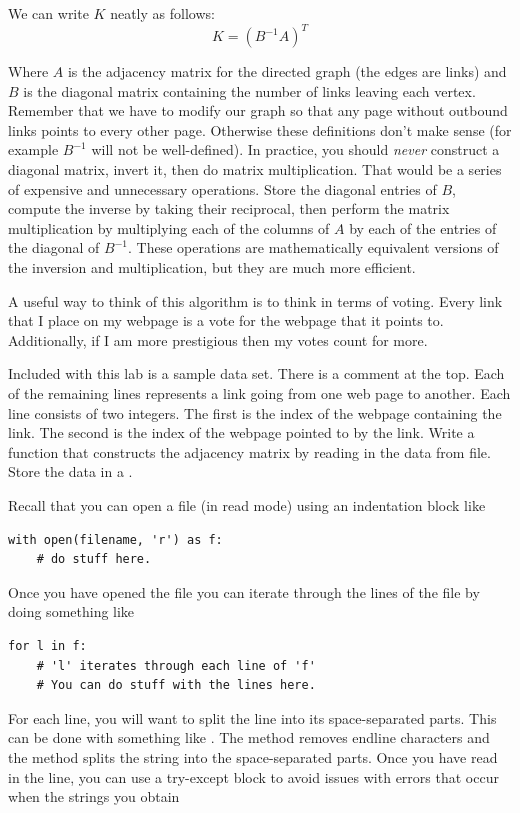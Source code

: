 We can write $K$ neatly as follows:
\[K = (B^{-1}A)^T\]

Where $A$ is the adjacency matrix for the directed graph (the edges are links) and $B$ is the diagonal matrix containing the number of links leaving each vertex.
Remember that we have to modify our graph so that any page without outbound links points to every other page.
Otherwise these definitions don't make sense (for example $B^{-1}$ will not be well-defined).
In practice, you should \textit{never} construct a diagonal matrix, invert it, then do matrix multiplication.
That would be a series of expensive and unnecessary operations.
Store the diagonal entries of $B$, compute the inverse by taking their reciprocal, then perform the matrix multiplication by multiplying each of the columns of $A$ by each of the entries of the diagonal of $B^{-1}$.
These operations are mathematically equivalent versions of the inversion and multiplication, but they are much more efficient.

A useful way to think of this algorithm is to think in terms of voting.
Every link that I place on my webpage is a vote for the webpage that it points to.
Additionally, if I am more prestigious then my votes count for more.

\begin{problem}
Included with this lab is a sample data set.
There is a comment at the top.
Each of the remaining lines represents a link going from one web page to another.
Each line consists of two integers.
The first is the index of the webpage containing the link.
The second is the index of the webpage pointed to by the link.
Write a function that constructs the adjacency matrix by reading in the data from file.
Store the data in a .

Recall that you can open a file (in read mode) using an indentation block like
\begin{lstlisting}
with open(filename, 'r') as f:
    # do stuff here.
\end{lstlisting}
Once you have opened the file you can iterate through the lines of the file by doing something like
\begin{lstlisting}
for l in f:
    # 'l' iterates through each line of 'f'
    # You can do stuff with the lines here.
\end{lstlisting}
For each line, you will want to split the line into its space-separated parts.
This can be done with something like .
The  method removes endline characters and the  method splits the string into the space-separated parts.
Once you have read in the line, you can use a try-except block to avoid issues with errors that occur when the strings you obtain 
\end{problem}

